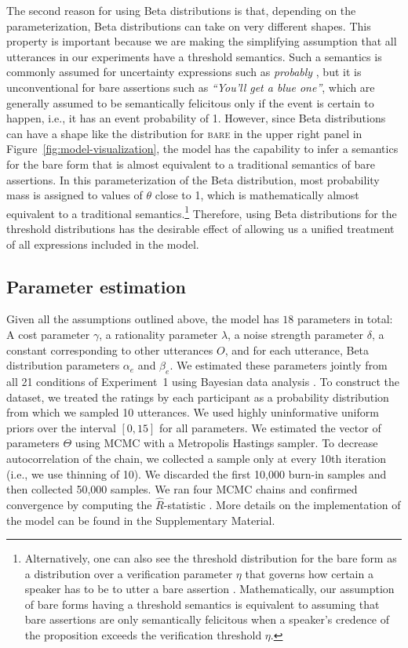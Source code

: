 \documentclass[man, floatsintext]{apa6}
\begin{document}
The second reason for using Beta distributions is that, depending on the parameterization, 
Beta distributions can take on very different shapes. This property is important because we are making
the simplifying assumption that all utterances in our experiments have a threshold semantics.
Such a semantics is commonly assumed for uncertainty expressions such as \textit{probably} \parencite[e.g.,][]{Yalcin2010,Lassiter2016}, 
but it is unconventional for bare assertions such as \textit{``You'll get a blue one''}, which are generally assumed to be  
semantically felicitous only if the event is certain to happen, i.e., it has an event probability of 1. However, since Beta distributions can have a shape 
like the distribution for \textsc{bare} in the upper right panel in Figure~\ref{fig:model-visualization}, the model has the capability to infer
a semantics for the bare form that is almost equivalent to a traditional semantics of bare assertions. In this parameterization of the
Beta distribution, most probability mass is assigned to values of $\theta$ close to 1, which is mathematically almost equivalent to
a traditional semantics.\footnote{Alternatively, one can also see the threshold distribution for the bare form as a distribution over a verification parameter $\eta$ that governs 
how certain a speaker has to be to utter a bare assertion \parencite[see, e.g.,][]{Moss2018}. Mathematically, our assumption of bare forms having a threshold
semantics is equivalent to assuming that bare assertions are only semantically felicitous when a speaker's credence of the proposition exceeds the verification threshold $\eta$.}
Therefore, using Beta distributions for the threshold distributions has the desirable effect of allowing us a unified treatment of all expressions included in the model. 

\subsection{Parameter estimation}

Given all the assumptions outlined above, the model has  $18$ parameters in total: A cost parameter $\gamma$, a rationality parameter $\lambda$, a noise strength parameter $\delta$, a constant corresponding to other utterances $O$, and for each utterance, Beta distribution parameters $\alpha_e$ and $\beta_e$. We estimated these parameters jointly from all 21 conditions of Experiment~1 using Bayesian data analysis \parencite[see, e.g.,][]{Kruschke2015}. To construct the dataset, we treated the ratings by each participant as a probability distribution from which we sampled 10 utterances. We used highly uninformative
uniform priors over the interval $[0,15]$ for all parameters. We estimated the vector of parameters $\Theta$ using MCMC with a Metropolis Hastings sampler. To decrease autocorrelation of the chain, we collected a sample only at every 10th iteration (i.e., we use thinning of 10). We discarded the first 10,000 burn-in samples and then collected 50,000 samples.  We ran four MCMC chains and confirmed convergence by computing the $\hat{R}$-statistic \parencite{Gelman2003}. More details on the implementation of the model can be found in the Supplementary Material.
\end{document}
